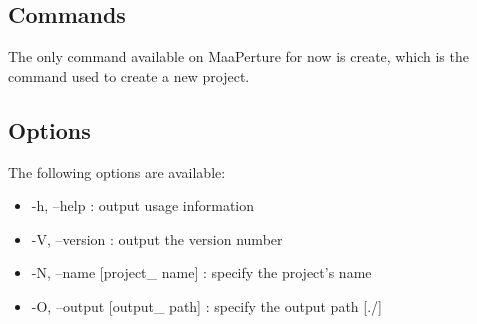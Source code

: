 \subsection{Commands}
\label{commands}
The only command available on MaaPerture for now is create, which is the command used to create a new project.

\subsection{Options}
\label{options}
The following options are available:
\begin{itemize}
\item -h, --help    :              output usage information
\item -V, --version  :             output the version number
\item -N, --name [project\_ name] :  specify the project's name
\item -O, --output [output\_ path] : specify the output path [./]
\end{itemize}


